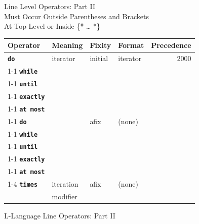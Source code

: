 \documentclass[12pt]{article}
\newcommand{\ttkey}[1]{{\tt \bfseries #1}}
\newlength{\figurewidth}
\newenvironment{boxedfigure}[1][!btp]%
	{\begin{figure}[#1]
	 \begin{lrbox}{\figurebox}
	 \begin{minipage}{\figurewidth}

	 \vspace*{1ex}}%
	{
	 \vspace*{1ex}

	 \end{minipage}
	 \end{lrbox}

	 \centering
	 \fbox{\hspace*{0.1in}\usebox{\figurebox}\hspace*{0.1in}}
	 \end{figure}}
\begin{document}
\begin{boxedfigure}[!p]
\begin{center}
Line Level Operators: Part II \\
Must Occur Outside Parentheses and Brackets \\
At Top Level or Inside \{* \ldots{} *\}
\\[1ex]
\begin{tabular}{|l|l|l|l|r|}
\hline
Operator & Meaning & Fixity & Format & Precedence \\
\hline
\ttkey{do} & iterator & initial & iterator & 2000
\\\cline{1-1}
\ttkey{while} &       &        &       &
\\\cline{1-1}
\ttkey{until} &       &        &       &
\\\cline{1-1}
\ttkey{exactly} &       &        &	&
\\\cline{1-1}
\ttkey{at most} &       &        &       &
\\\cline{1-1}\cline{3-4}
\ttkey{do} & 	& afix & (none)	&
\\\cline{1-1}
\ttkey{while} &       &        &       &
\\\cline{1-1}
\ttkey{until} &       &        &       &
\\\cline{1-1}
\ttkey{exactly} &       &        &	&
\\\cline{1-1}
\ttkey{at most} &       &        &       &
\\\cline{1-4}
\ttkey{times} & iteration & afix   & (none) & \\
               & modifier &        &       &
\\\hline
\end{tabular}
\end{center}

\caption{L-Language Line Operators: Part II}
\label{L-LANGUAGE-LINE-OPERATORS-2}
\end{boxedfigure}
\end{document}
